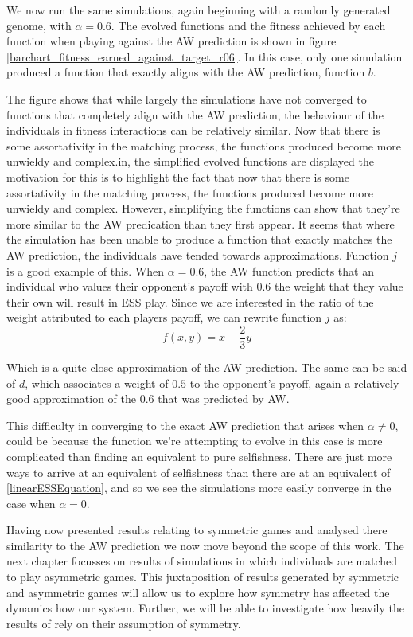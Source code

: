 \documentclass[11pt]{book}
\newcommand*{\np}{\par\noindent\newline}
\begin{document}
\np We now run the same simulations, again beginning with a randomly generated genome, with $\alpha = 0.6$.
The evolved functions and the fitness achieved by each function when playing against the AW prediction is shown in figure \ref{barchart_fitness_earned_against_target_r06}.
In this case, only one simulation produced a function that exactly aligns with the AW prediction, function $b$.
\np The figure shows that while largely the simulations have not converged to functions that completely align with the AW prediction,
the behaviour of the individuals in fitness interactions can be relatively similar.
Now that there is some assortativity in the matching process, the functions produced become more unwieldy and complex.in, the simplified evolved functions are displayed the motivation for this is to highlight the fact that now that there is some assortativity in the matching process, the functions produced become more unwieldy and complex.
However, simplifying the functions can show that they're more similar to the AW predication than they first appear.
It seems that where the simulation has been unable to produce a function that exactly matches the AW prediction, the individuals have tended towards approximations.
Function $j$ is a good example of this.
When $\alpha = 0.6$, the AW function predicts that an individual who values their opponent's payoff with 0.6 the weight that they value their own will result in ESS play.
Since we are interested in the ratio of the weight attributed to each players payoff, we can rewrite function $j$ as:
\begin{equation*}
	f(x, y) = x + \frac{2}{3} y
\end{equation*}


\noindent Which is a quite close approximation of the AW prediction.
The same can be said of $d$, which associates a weight of $0.5$ to the opponent's payoff, again a relatively good approximation of the $0.6$ that was predicted by AW.

\np This difficulty in converging to the exact AW prediction that arises when $\alpha \neq 0$, could be because the function we're attempting to evolve in this case is more complicated than finding an equivalent to pure selfishness.
There are just more ways to arrive at an equivalent of selfishness than there are at an equivalent of \ref{linearESSEquation}, and so we see the simulations more easily converge in the case when $\alpha = 0$.


\np Having now presented results relating to symmetric games and analysed there similarity to the AW prediction we now move beyond the scope of this work.
The next chapter focusses on results of simulations in which individuals are matched to play asymmetric games.
This juxtaposition of results generated by symmetric and asymmetric games will allow us to explore how symmetry has affected the dynamics how our system.
Further, we will be able to investigate how heavily the results of \citeauthor{alger_generalization_2012} rely on their assumption of symmetry.
\end{document}
